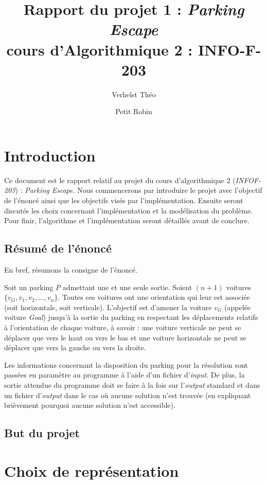 \documentclass{article}
\title{Rapport du projet 1 : \textit{Parking Escape}\\cours d'Algorithmique 2 : INFO-F-203}
\author{Verhelst Théo \and Petit Robin}
\begin{document}
\maketitle
\tableofcontents
\newpage
{}

\section{Introduction}
    Ce document est le rapport relatif au projet du cours d'algorithmique 2 (\textit{INFOF-203}) : \textit{Parking Escape}. Nous commencerons par introduire le projet
    avec l'objectif de l'énoncé ainsi que les objectifs visés par l'implémentation. Ensuite seront discutés les choix concernant l'implémentation et la
    modélisation du problème. Pour finir, l'algorithme et l'implémentation seront détaillés avant de conclure.

    \subsection{Résumé de l'énoncé}
        En bref, résumons la consigne de l'énoncé.

        Soit un parking $P$ admettant une et une seule sortie. Soient $(n+1)$ voitures $\{v_G, v_1, v_2, \ldots, v_n\}$. Toutes ces voitures ont une orientation qui leur est
        associée (soit horizontale, soit verticale). L'objectif est d'amener la voiture $v_G$ (appelée voiture \textit{Goal}) jusqu'à la sortie du parking en respectant les
        déplacements relatifs à l'orientation de chaque voiture, à savoir : une voiture verticale ne peut se déplacer que vers le haut ou vers le bas et une voiture
        horizontale ne peut se déplacer que vers la gauche ou vers la droite.

        Les informations concernant la disposition du parking pour la résolution sont passées en paramètre au programme à l'aide d'un fichier d'\textit{input}.
        De plus, la sortie attendue du programme doit se faire à la fois sur l'\textit{output} standard et dans un fichier d'\textit{output} dans le cas où
        aucune solution n'est trouvée (en expliquant brièvement pourquoi aucune solution n'est accessible).

    \subsection{But du projet}

\section{Choix de représentation}
\end{document}
